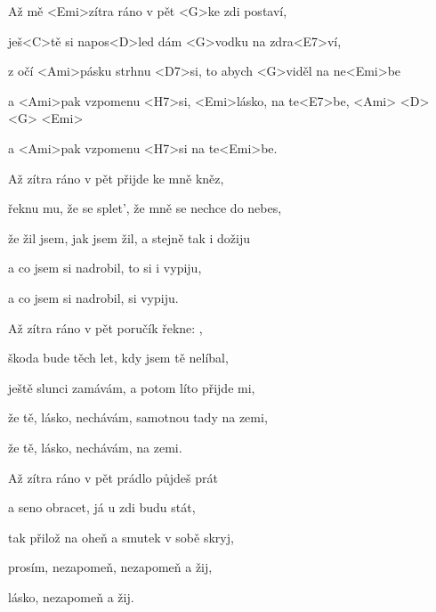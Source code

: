 

\zs
Až mě <Emi>zítra ráno v pět
<G>ke zdi postaví,

ješ<C>tě si napos<D>led
dám <G>vodku na zdra<E7>ví,

z očí <Ami>pásku {strhnu} <D7>si, to
abych <G>viděl na ne<Emi>be

a <Ami>pak vzpomenu <H7>si,
<Emi>lásko, na te<E7>be,
<Ami> <D> <G> <Emi>

a <Ami>pak vzpomenu <H7>si na te<Emi>be.
\ks

\zs
Až zítra ráno v pět přijde ke mně kněz,

řeknu mu, že se splet', že mně se nechce do nebes,

že žil jsem, jak jsem žil, a stejně tak i dožiju

a co jsem si nadrobil, to si i vypiju,

a co jsem si nadrobil, si vypiju.
\ks

\zs
Až zítra ráno v pět poručík řekne: ,

škoda bude těch let, kdy jsem tě nelíbal,

ještě slunci zamávám, a potom líto přijde mi,

že tě, lásko, nechávám, samotnou tady na zemi,

že tě, lásko, nechávám, na zemi.
\ks

\zs
Až zítra ráno v pět prádlo půjdeš prát

a seno obracet, já u zdi budu stát,

tak přilož na oheň a smutek v sobě skryj,

prosím, nezapomeň, nezapomeň a žij,

lásko, nezapomeň a žij.
\ks

\kp























